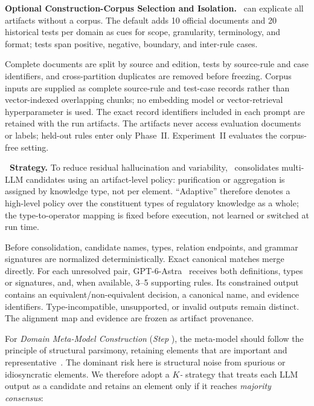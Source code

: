 \noindent
\textbf{Optional Construction-Corpus Selection and Isolation.}
\ourtool\ can explicate all artifacts without a corpus. The default adds
10 official documents and 20 historical tests per domain as cues for scope,
granularity, terminology, and format; tests span positive, negative, boundary,
and inter-rule cases.

Complete documents are split by source and edition, tests
by source-rule and case identifiers, and cross-partition duplicates are
removed before freezing. Corpus inputs are supplied as complete source-rule and
test-case records rather than vector-indexed overlapping chunks; no embedding
model or vector-retrieval hyperparameter is used. The exact record identifiers
included in each prompt are retained with the run artifacts. The artifacts
never access evaluation documents or labels; held-out rules enter only
Phase~II. Experiment~II evaluates the corpus-free setting.








\noindent
\textbf{\strategy\ Strategy.}
To reduce residual hallucination and variability, \strategy\ consolidates
multi-LLM candidates using an artifact-level policy: purification or
aggregation is assigned by knowledge type, not per element. ``Adaptive''
therefore denotes a high-level policy over the constituent types of regulatory
knowledge as a whole; the type-to-operator mapping is fixed before execution,
not learned or switched at run time.

Before consolidation, candidate names, types, relation endpoints, and grammar
signatures are normalized deterministically. Exact canonical matches merge
directly. For each unresolved pair, GPT-6-Astra~\cite{gpt} receives both
definitions, types or signatures, and, when available, 3--5 supporting rules.
Its constrained output contains an equivalent/non-equivalent decision, a
canonical name, and evidence identifiers. Type-incompatible, unsupported, or
invalid outputs remain distinct. The alignment map and evidence are frozen as
artifact provenance.


For \textit{Domain Meta-Model Construction} (\textit{Step} ), the meta-model should follow the principle of structural parsimony, retaining elements that are important and representative~\cite{evans2004domain,harvey2005languages}. The dominant risk here is structural noise from spurious or idiosyncratic elements. We therefore adopt a \textit{$K$-\strategymm} strategy that treats each LLM output as a candidate and retains an element only if it reaches \emph{majority consensus}:


